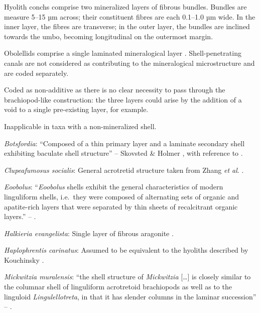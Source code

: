 \documentclass[openany]{book}
\theoremstyle{definition}
\theoremstyle{definition}
\theoremstyle{definition}
\theoremstyle{remark}
\begin{document}
Hyolith conchs comprise two mineralized layers of fibrous bundles.
Bundles are measure 5--15 µm across; their constituent fibres are each
0.1--1.0 µm wide. In the inner layer, the fibres are transverse; in the
outer layer, the bundles are inclined towards the umbo, becoming
longitudinal on the outermost margin.

Obolellids comprise a single laminated mineralogical layer
\citep{Balthasar2008iMummpikia}. Shell-penetrating canals are not
considered as contributing to the mineralogical microstructure and are
coded separately.

Coded as non-additive as there is no clear necessity to pass through the
brachiopod-like construction: the three layers could arise by the
addition of a void to a single pre-existing layer, for example.

Inapplicable in taxa with a non-mineralized shell.

\hypertarget{Botsfordia-coding-126}{}
\emph{Botsfordia}: ``Composed of a thin primary layer and a laminate
secondary shell exhibiting baculate shell structure'' -- Skovsted \&
Holmer \citeyearpar{Skovsted2005EarlyCambrian}, with reference to
\citet{Skovsted2003EarlyCambrian}.

\hypertarget{Clupeafumosus_socialis-coding-126}{}
\emph{Clupeafumosus socialis}: General acrotretid structure taken from
Zhang \emph{et al}. \citeyearpar{Zhang2016Epithelialcell}.

\hypertarget{Eoobolus-coding-126}{}
\emph{Eoobolus}: ``\emph{Eoobolus} shells exhibit the general
characteristics of modern linguliform shells, i.e.~they were composed of
alternating sets of organic and apatite-rich layers that were separated
by thin sheets of recalcitrant organic layers.'' --
\citet{Balthasar2007Anearly}.

\hypertarget{Halkieria_evangelista-coding-126}{}
\emph{Halkieria evangelista}: Single layer of fibrous aragonite
\citep{Porter2008}.

\hypertarget{Haplophrentis_carinatus-coding-126}{}
\emph{Haplophrentis carinatus}: Assumed to be equivalent to the hyoliths
described by Kouchinsky
\citeyearpar{Kouchinsky2000Skeletalmicrostructures}.

\hypertarget{Mickwitzia_muralensis-coding-126}{}
\emph{Mickwitzia muralensis}: ``the shell structure of \emph{Mickwitzia}
{[}\ldots{}{]} is closely similar to the columnar shell of linguliform
acrotretoid brachiopods as well as to the linguloid
\emph{Lingulellotreta}, in that it has slender columns in the laminar
succession'' -- \citet{Williams2007Supplement}.
\end{document}
